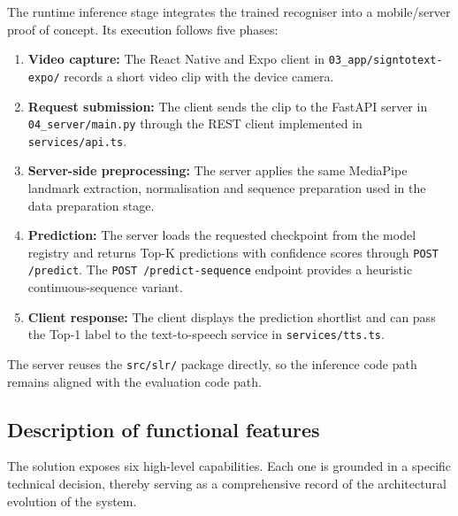 The runtime inference stage integrates the trained recogniser into a mobile/server proof of
concept. Its execution follows five phases:

\begin{enumerate}
    \item \textbf{Video capture:} The React Native and Expo client in
          \texttt{03\_app/signtotext-expo/} records a short video clip with the device camera.
    \item \textbf{Request submission:} The client sends the clip to the FastAPI server in
          \texttt{04\_server/main.py} through the REST client implemented in
          \texttt{services/api.ts}.
    \item \textbf{Server-side preprocessing:} The server applies the same MediaPipe landmark
          extraction, normalisation and sequence preparation used in the data preparation stage.
    \item \textbf{Prediction:} The server loads the requested checkpoint from the model registry
          and returns Top-K predictions with confidence scores through \texttt{POST /predict}.
          The \texttt{POST /predict-sequence} endpoint provides a heuristic continuous-sequence
          variant.
    \item \textbf{Client response:} The client displays the prediction shortlist and can pass the
          Top-1 label to the text-to-speech service in \texttt{services/tts.ts}.
\end{enumerate}

The server reuses the \texttt{src/slr/} package directly, so the inference code path remains
aligned with the evaluation code path.

\subsection{Description of functional features}
\label{sec:functional_features}

The solution exposes six high-level capabilities. Each one is grounded in a specific technical
decision, thereby serving as a comprehensive record of the architectural evolution of the system.

